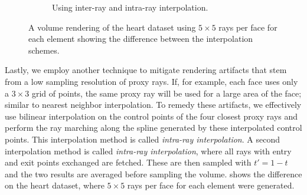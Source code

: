 \begin{figure}
\begin{subfigure}[b]{0.4\textwidth}
    \caption{Using inter-ray and intra-ray interpolation.}
    \label{contribution:medbio:fem:interpolation}
\end{subfigure}
\caption{A volume rendering of the heart dataset using $5\times 5$ rays per face for each element showing the difference between the interpolation schemes.}
\label{contribution:medbio:fem:interpolationexample}
\end{figure}

Lastly, we employ another technique to mitigate rendering artifacts that stem from a low sampling resolution of proxy rays. If, for example, each face uses only a $3 \times 3$ grid of points, the same proxy ray will be used for a large area of the face; similar to nearest neighbor interpolation. To remedy these artifacts, we effectively use bilinear interpolation on the control points of the four closest proxy rays and perform the ray marching along the spline generated by these interpolated control points. This interpolation method is called \emph{intra-ray interpolation}. A second interpolation method is called \emph{intra-ray interpolation}, where all rays with entry and exit points exchanged are fetched. These are then sampled with $t' = 1-t$ and the two results are averaged before sampling the volume.  shows the difference on the heart dataset, where $5\times 5$ rays per face for each element were generated.

